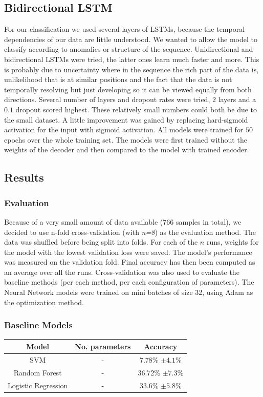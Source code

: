 \documentclass{article}
\begin{document}
\subsection{Bidirectional LSTM}
For our classification we used several layers of LSTMs, because the temporal dependencies of our data are little understood. We wanted to allow the model to classify according to anomalies or structure of the sequence. Unidirectional and bidirectional LSTMs were tried, the latter ones learn much faster and more. This is probably due to uncertainty where in the sequence the rich part of the data is, unlikelihood that is at similar positions and the fact that the data is not temporally resolving but just developing so it can be viewed equally from both directions. Several number of layers and dropout rates were tried, $2$ layers and a $0.1$ dropout scored highest. These relatively small numbers could both be due to the small dataset. A little improvement was gained by replacing hard-sigmoid activation for the input with sigmoid activation. All models were trained for $50$ epochs over the whole training set. The models were first trained without the weights of the decoder and then compared to the model with trained encoder.
\subsection{Results}
\subsubsection{Evaluation}
Because of a very small amount of data available (766 samples in total), we decided to use n-fold cross-validation (with \textit{n=8}) as the evaluation method. The data was shuffled before being split into folds. For each of the $n$ runs, weights for the model with the lowest validation loss were saved. The model's performance was measured on the validation fold. Final accuracy has then been computed as an average over all the runs.
Cross-validation was also used to evaluate the baseline methods (per each method, per each configuration of parameters).
\newline
The Neural Network models were trained on mini batches of size 32, using Adam \cite{Adam} as the optimization method.
\subsubsection{Baseline Models}
\begin{center}
\begin{tabular}{ c|c|c } 
 Model & No. parameters & Accuracy \\ 
 \hline
 SVM & - & 7.78\% $\pm 4.1\% $\\ 
 Random Forest & - & 36.72\% $\pm 7.3\%$ \\ 
 Logistic Regression & - & 33.6\% $\pm 5.8\%$ \\ 
\end{tabular}
\end{center}
\end{document}
